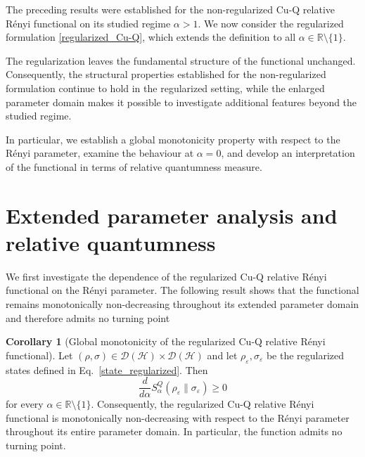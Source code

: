 \documentclass[a4paper, amsfonts, amssymb, amsmath, reprint, showkeys, nofootinbib, twoside, aps, pra]{revtex4-2}
\theoremstyle{definition}
\newtheorem{corollary}[theorem]{Corollary}
\begin{document}
The preceding results were established for the non-regularized Cu-Q relative Rényi functional on its studied regime $\alpha>1$. We now consider the regularized formulation \eqref{regularized_Cu-Q}, which extends the definition to all $\alpha\in\mathbb R\setminus\{1\}$.

The regularization leaves the fundamental structure of the functional unchanged. Consequently, the structural properties established for the non-regularized formulation continue to hold in the regularized setting, while the enlarged parameter domain makes it possible to investigate additional features beyond the studied regime.

In particular, we establish a global monotonicity property with respect to the Rényi parameter, examine the behaviour at $\alpha=0$, and develop an interpretation of the functional in terms of relative
quantumness measure.

\section{Extended parameter analysis and relative quantumness} \label{Relative Quantumness}

We first investigate the dependence of the regularized Cu-Q relative Rényi functional on the Rényi parameter. The following result shows that the functional remains monotonically non-decreasing throughout its extended parameter domain and therefore admits no turning point

\begin{corollary}[Global monotonicity of the regularized Cu-Q relative Rényi functional]
Let $(\rho,\sigma)\in\mathcal D(\mathcal H) \times \mathcal D(\mathcal H)$ and let $ \rho_\varepsilon,\sigma_\varepsilon $ be the regularized states defined in Eq.~\eqref{state_regularized}. Then
\begin{equation}
    \frac{d}{d\alpha} S_\alpha^Q(\rho_\varepsilon\|\sigma_\varepsilon)\ge 0
\end{equation}
for every $\alpha\in\mathbb R\setminus\{1\}.$ Consequently, the regularized Cu-Q relative Rényi functional is
monotonically non-decreasing with respect to the Rényi parameter throughout its entire parameter domain. In particular, the function admits no turning point.
\end{corollary}
\end{document}
